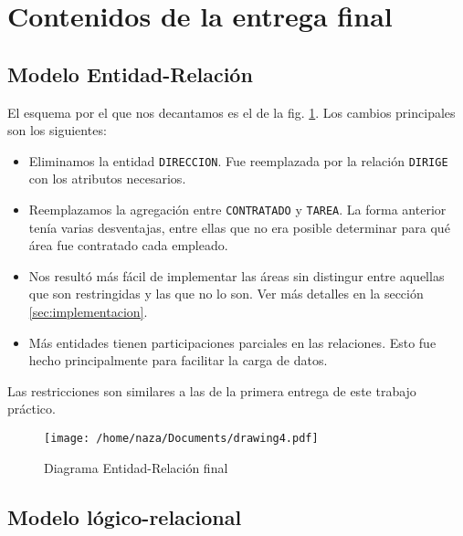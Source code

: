 \section{Contenidos de la entrega final}

\subsection{Modelo Entidad-Relación}

El esquema por el que nos decantamos es el de la fig. \ref{fig:der-2}. Los 
cambios principales son los siguientes:

\begin{itemize}

    \item Eliminamos la entidad \verb|DIRECCION|. Fue reemplazada por la 
    relación \verb|DIRIGE| con los atributos necesarios.

    \item Reemplazamos la agregación entre \verb|CONTRATADO| y \verb|TAREA|.
    La forma anterior tenía varias desventajas, entre ellas que no era posible
    determinar para qué área fue contratado cada empleado.

    \item Nos resultó más fácil de implementar las áreas sin distingur entre
    aquellas que son restringidas y las que no lo son. Ver más detalles en la
    sección \ref{sec:implementacion}.

    \item Más entidades tienen participaciones parciales en las relaciones. 
    Esto fue hecho principalmente para facilitar la carga de datos.

\end{itemize}

Las restricciones son similares a las de la primera entrega de este trabajo
práctico.

\begin{landscape}
    \begin{figure}[h]
        \centering
        \texttt{[image: /home/naza/Documents/drawing4.pdf]}
        \caption{Diagrama Entidad-Relación final}
        \label{fig:der-2}
    \end{figure}
\end{landscape}

\subsection{Modelo lógico-relacional}

